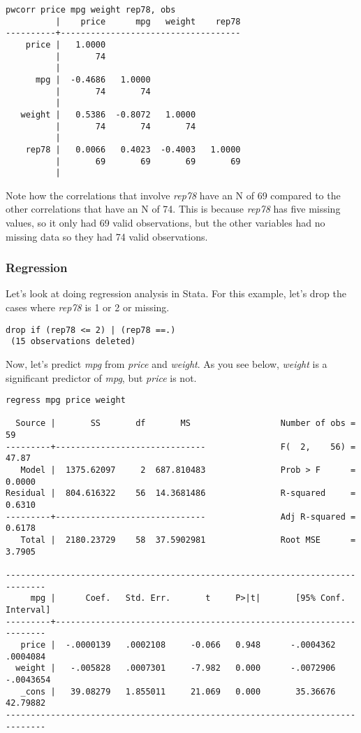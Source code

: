 \begin{lstlisting}
pwcorr price mpg weight rep78, obs
          |    price      mpg   weight    rep78
----------+------------------------------------
    price |   1.0000
          |       74
          |
      mpg |  -0.4686   1.0000
          |       74       74
          |
   weight |   0.5386  -0.8072   1.0000
          |       74       74       74
          |
    rep78 |   0.0066   0.4023  -0.4003   1.0000
          |       69       69       69       69
          |
\end{lstlisting}

Note how the correlations that involve \textit{rep78} have an N of 69 compared to the other correlations that have an N of 74. This is because \textit{rep78} has five missing values, so it only had 69 valid observations, but the other variables had no missing data so they had 74 valid observations.

\subsubsection{Regression}

Let's look at doing regression analysis in Stata. For this example, let's drop the cases where \textit{rep78} is 1 or 2 or missing.

\begin{lstlisting}
drop if (rep78 <= 2) | (rep78 ==.)
 (15 observations deleted)
\end{lstlisting}

Now, let's predict \textit{mpg} from \textit{price} and \textit{weight}. As you see below, \textit{weight} is a significant predictor of \textit{mpg}, but \textit{price} is not.

\begin{lstlisting}
regress mpg price weight

  Source |       SS       df       MS                  Number of obs =      59
---------+------------------------------               F(  2,    56) =   47.87
   Model |  1375.62097     2  687.810483               Prob > F      =  0.0000
Residual |  804.616322    56  14.3681486               R-squared     =  0.6310
---------+------------------------------               Adj R-squared =  0.6178
   Total |  2180.23729    58  37.5902981               Root MSE      =  3.7905

------------------------------------------------------------------------------
     mpg |      Coef.   Std. Err.       t     P>|t|       [95% Conf. Interval]
---------+--------------------------------------------------------------------
   price |  -.0000139   .0002108     -0.066   0.948      -.0004362    .0004084
  weight |   -.005828   .0007301     -7.982   0.000      -.0072906   -.0043654
   _cons |   39.08279   1.855011     21.069   0.000       35.36676    42.79882
------------------------------------------------------------------------------
\end{lstlisting}


